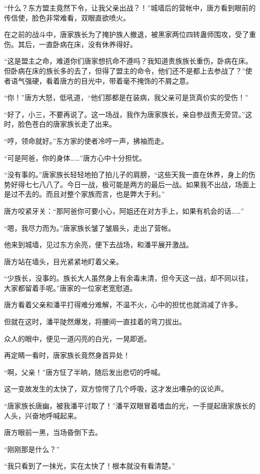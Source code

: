 \begin{this_body}
“什么？东方盟主竟然下令，让我父亲出战？！”城墙后的营帐中，唐方看到眼前的传信使，脸色非常难看，双眼直欲喷火。

在之前的战斗中，唐家族长为了掩护族人撤退，被黑家两位四转蛊师围攻，受了重伤。其后，一直卧病在床，没有休养得好。

“这是盟主之命，难道你们唐家想抗命不遵吗？我知道贵族族长重伤，卧病在床。但卧病在床的族长多的去了，但得了盟主的命令，他们还不是都上去参战了？”使者语气强硬，看着唐方的目光中，带着毫不掩饰的不屑之意。

“你！”唐方大怒，低吼道，“他们那都是在装病，我父亲可是货真价实的受伤！”

“好了，小三，不要再说了。这一场战，我作为唐家族长，亲自参战责无旁贷。”这时，脸色苍白的唐家族长走了出来。

“哼，领命就好。”东方家的使者冷哼一声，拂袖而走。

“可是阿爸，你的身体……”唐方心中十分担忧。

“没有事的。”唐家族长轻轻地拍了拍儿子的肩膀，“这些天我一直在休养，身上的伤势好得七七八八了。今日一战，极可能是两方的最后一战。如果我不出战，场面上是过不去的。而且对整个家族而言，也是弊大于利。”

唐方咬紧牙关：“那阿爸你可要小心，阿姐还在对方手上，如果有机会的话……”

“嗯，我尽力而为。”唐家族长皱了皱眉头，走出了营帐。

他来到城墙，见过东方余亮，便下去战场，和潘平展开激战。

唐方站在墙头，目光紧紧地盯着父亲。

“少族长，没事的。族长大人虽然身上有余毒未清，但今天这一战，却不同以往，大家都留着手呢。”唐家的一位家老宽慰道。

唐方看着父亲和潘平打得难分难解，不温不火，心中的担忧也就消减了许多。

但就在这时，潘平陡然爆发，将腰间一直挂着的弯刀拔出。

众人的眼中，便见一道闪亮的白光，一晃即逝。

再定睛一看时，唐家族长竟然身首异处！

“啊，父亲！”唐方怔了半晌，随后发出悲切的呼喊。

这一变故发生的太快了，双方惊愕了几个呼吸，这才发出嘈杂的议论声。

“唐家族长唐幽，被我潘平讨取了！”潘平双眼冒着嗜血的光，一手提起唐家族长的人头，兴奋地呼喊起来。

唐方眼前一黑，当场昏倒下去。

“刚刚那是什么？”

“我只看到了一抹光，实在太快了！根本就没有看清楚。”


\end{this_body}
